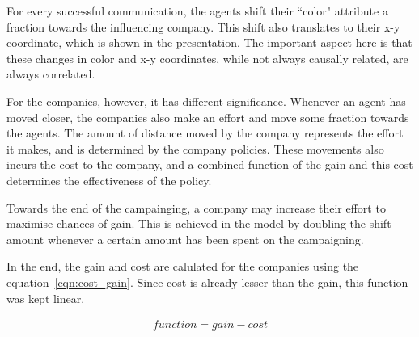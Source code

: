 For every successful communication, the agents shift their ``color" attribute a fraction towards the influencing company. This shift also translates to their x-y coordinate, which is shown in the presentation. The important aspect here is that these changes in color and x-y coordinates, while not always causally related, are always correlated. 

For the companies, however, it has different significance. Whenever an agent has moved closer, the companies also make an effort and move some fraction towards the agents. The amount of distance moved by the company represents the effort it makes, and is determined by the company policies. These movements also incurs the cost to the company, and a combined function of the gain and this cost determines the effectiveness of the policy.

Towards the end of the campainging, a company may increase their effort to maximise chances of gain. This is achieved in the model by doubling the shift amount whenever a certain amount has been spent on the campaigning.


In the end, the gain and cost are calulated for the companies using the equation~\ref{eqn:cost_gain}. Since cost is already lesser than the gain, this function was kept linear.

\begin{eqnarray}
function = gain - cost \\
\label{eqn:cost_gain}
\end{eqnarray}



